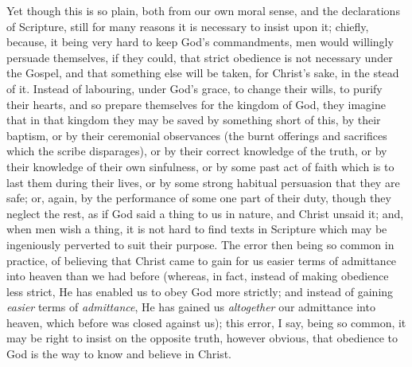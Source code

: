 Yet though this is so plain, both from our own moral sense, and the
declarations of Scripture, still for many reasons it is necessary to
insist upon it; chiefly, because, it being very hard to keep God's
commandments, men would willingly persuade themselves, if they could,
that strict obedience is not necessary under the Gospel, and that
something else will be taken, for Christ's sake, in the stead of it.
Instead of labouring, under God's grace, to change their wills, to
purify their hearts, and so prepare themselves for the kingdom of God,
they imagine that in that kingdom they may be saved by something short
of this, by their baptism, or by their ceremonial observances (the
burnt offerings and sacrifices which the scribe disparages), or by
their correct knowledge of the truth, or by their knowledge of their
own sinfulness, or by some past act of faith which is to last them
during their lives, or by some strong habitual persuasion that they
are safe; or, again, by the performance of some one part of their
duty, though they neglect the rest, as if God said a thing to us in
nature, and Christ unsaid it; and, when men wish a thing, it is not
hard to find texts in Scripture which may be ingeniously perverted to
suit their purpose. The error then being so common in practice, of
believing that Christ came to gain for us easier terms of admittance
into heaven than we had before (whereas, in fact, instead of making
obedience less strict, He has enabled us to obey God more strictly;
and instead of gaining \emph{easier} terms of \emph{admittance}, He
has gained us \emph{altogether} our admittance into heaven, which
before was closed against us); this error, I say, being so common, it
may be right to insist on the opposite truth, however obvious, that
obedience to God is the way to know and believe in Christ.

